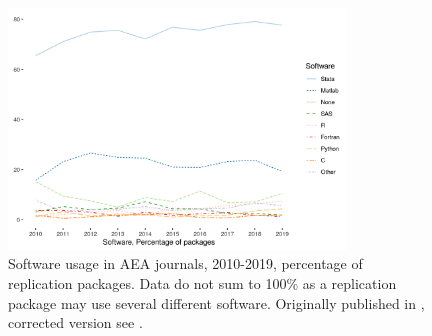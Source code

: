 
\begin{figure}
    \centering
    \includegraphics[width=0.8\textwidth]{pandp-2020-software-updated.png}
    \caption{Software usage in AEA journals, 2010-2019, percentage of replication packages. Data do not sum to 100\% as a replication package may use several different software. Originally published in \citet{10.1257/pandp.110.764}, corrected version see \citet{vilhuber_migrating_2020}.}
    \label{fig:software}
\end{figure}
